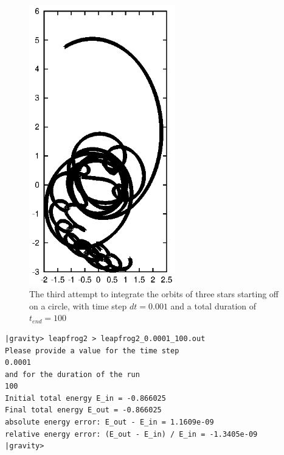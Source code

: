 \begin{figure}[htb]
\centering
\includegraphics[width=2.5in]{chap5/leapfrog2_0.001_100.ps}
\caption[Three stars on a circle, leapfrog, $dt = 0.001$, $t_{end} = 100$]
{The third attempt to integrate the orbits of three stars
starting off on a circle, with time step $dt = 0.001$ and a total
duration of $t_{end} = 100$}
\label{fig:leap2-0.001-100}
\end{figure}

\begin{small}
\begin{verbatim}
|gravity> leapfrog2 > leapfrog2_0.0001_100.out
Please provide a value for the time step
0.0001
and for the duration of the run
100
Initial total energy E_in = -0.866025
Final total energy E_out = -0.866025
absolute energy error: E_out - E_in = 1.1609e-09
relative energy error: (E_out - E_in) / E_in = -1.3405e-09
|gravity>
\end{verbatim}
\end{small}

